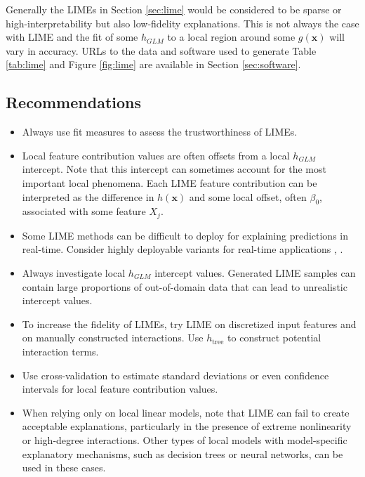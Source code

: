 \documentclass[11pt]{asaproc}
\begin{document}
Generally the LIMEs in Section \ref{sec:lime} would be considered to be sparse or high-interpretability but also low-fidelity explanations. This is not always the case with LIME and the fit of some $h_{GLM}$ to a local region around some $g(\mathbf{x})$ will vary in accuracy. URLs to the data and software used to generate Table \ref{tab:lime} and Figure \ref{fig:lime} are available in Section \ref{sec:software}.

\subsection{Recommendations}

\begin{itemize}
	
	\item Always use fit measures to assess the trustworthiness of LIMEs.

	\item Local feature contribution values are often offsets from a local $h_{GLM}$ intercept. Note that this intercept can sometimes account for the most important local phenomena. Each LIME feature contribution can be interpreted as the difference in $h(\mathbf{x})$ and some local offset, often $\beta_0$, associated with some  feature $X_j$.

	\item Some LIME methods can be difficult to deploy for explaining predictions in real-time. Consider highly deployable variants for real-time applications \cite{h2o_mli_booklet}, \cite{lime-sup}.
		
	\item Always investigate local $h_{GLM}$ intercept values. Generated LIME samples can contain large proportions of out-of-domain data that can lead to unrealistic intercept values. 
		
	\item To increase the fidelity of LIMEs, try LIME on discretized input features and on manually constructed interactions. Use $h_{\text{tree}}$ to construct potential interaction terms.
 	
	\item Use cross-validation to estimate standard deviations or even confidence intervals for local feature contribution values.
	
	\item When relying only on local linear models, note that LIME can fail to create acceptable explanations, particularly in the presence of extreme nonlinearity or high-degree interactions. Other types of local models with model-specific explanatory mechanisms, such as decision trees or neural networks, can be used in these cases. 
	
\end{itemize}
\end{document}
